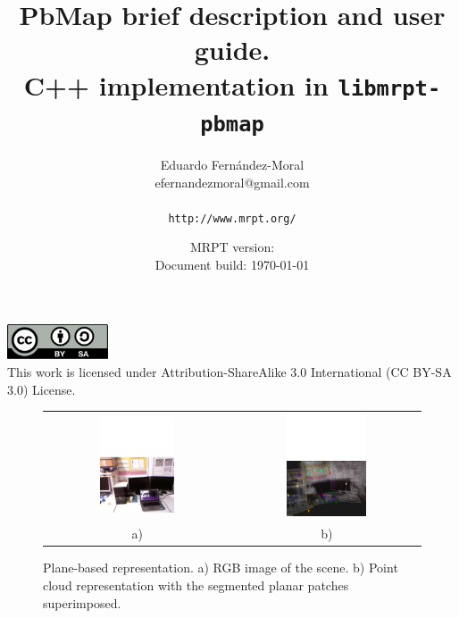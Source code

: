 \documentclass[a4paper,11pt]{article}
\title{PbMap brief description and user guide.\\C++ implementation in \texttt{libmrpt-pbmap}}
\author{Eduardo Fern\'andez-Moral \\ efernandezmoral@gmail.com \\
\\
\texttt{http://www.mrpt.org/} }
\date{MRPT version: \MRPTVERSION \\ Document build: \today }
\begin{document}
\maketitle


\vfill

\begin{scriptsize}
\begin{center}
\includegraphics[width=3cm]{imgs/by-sa.pdf}
\\
This work is licensed under Attribution-ShareAlike 3.0 International (CC BY-SA 3.0) License.
\end{center}
\end{scriptsize}


\newpage
\tableofcontents
\newpage

\begin{figure}[t!]
    \begin{center}
    \begin{tabular}{cc}
		\includegraphics[width=0.42\textwidth]{imgs/scene.pdf} & \includegraphics[width=0.45\textwidth]{imgs/pbmap.pdf} \\
		\scriptsize a) & \scriptsize b) \\
    \end{tabular}
    \end{center}
    \caption{Plane-based representation. a) RGB image of the scene. b) Point cloud representation with the segmented planar patches superimposed.}
	\label{fig:pbmap}
\end{figure}
\end{document}
